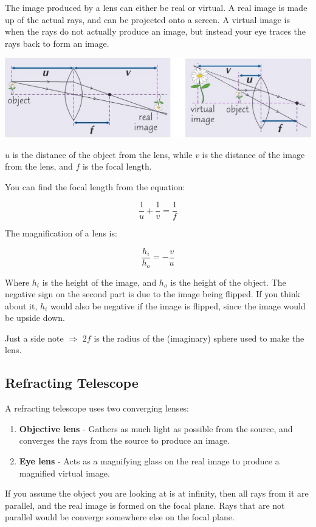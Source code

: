 \documentclass[a4paper, 12pt]{article}
\begin{document}
The image produced by a lens can either be real or virtual. A real image is made up of the actual rays, and can be projected onto a screen. A virtual image is when the rays do not actually produce an image, but instead your eye traces the rays back to form an image.

\includegraphics[width=\textwidth]{images/realAndImaginaryImages.png}

$u$ is the distance of the object from the lens, while $v$ is the distance of the image from the lens, and $f$ is the focal length.

You can find the focal length from the equation:

$$
\frac{1}{u} + \frac{1}{v} = \frac{1}{f}
$$

The magnification of a lens is:

$$
\frac{h_i}{h_o} = -\frac{v}{u}
$$

Where $h_i$ is the height of the image, and $h_o$ is the height of the object. The negative sign on the second part is due to the image being flipped. If you think about it, $h_i$ would also be negative if the image is flipped, since the image would be upside down.

Just a side note $\Rightarrow$ $2f$ is the radius of the (imaginary) sphere used to make the lens.

\subsection{Refracting Telescope}

A refracting telescope uses two converging lenses:

\begin{enumerate}
	\item{
		\textbf{Objective lens} - Gathers as much light as possible from the source, and converges the rays from the source to produce an image.
	}
	\item{
		\textbf{Eye lens} - Acts as a magnifying glass on the real image to produce a magnified virtual image.
	}
\end{enumerate}

If you assume the object you are looking at is at infinity, then all rays from it are parallel, and the real image is formed on the focal plane. Rays that are not parallel would be converge somewhere else on the focal plane.
\end{document}
